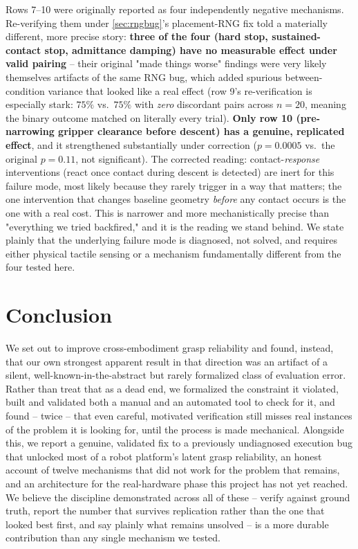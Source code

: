 \documentclass[journal]{IEEEtran}
\begin{document}
Rows 7--10 were originally reported as four independently negative
mechanisms. Re-verifying them under \cref{sec:rngbug}'s placement-RNG fix
told a materially different, more precise story: \textbf{three of the
four (hard stop, sustained-contact stop, admittance damping) have no
measurable effect under valid pairing} -- their original "made things
worse" findings were very likely themselves artifacts of the same RNG bug,
which added spurious between-condition variance that looked like a real
effect (row 9's re-verification is especially stark: $75\%$ vs.\ $75\%$
with \emph{zero} discordant pairs across $n{=}20$, meaning the binary
outcome matched on literally every trial). \textbf{Only row 10
(pre-narrowing gripper clearance before descent) has a genuine, replicated
effect}, and it strengthened substantially under correction ($p{=}0.0005$
vs.\ the original $p{=}0.11$, not significant). The corrected reading:
contact-\emph{response} interventions (react once contact during descent
is detected) are inert for this failure mode, most likely because they
rarely trigger in a way that matters; the one intervention that changes
baseline geometry \emph{before} any contact occurs is the one with a real
cost. This is narrower and more mechanistically precise than "everything
we tried backfired," and it is the reading we stand behind. We state
plainly that the underlying failure mode is diagnosed, not solved, and
requires either physical tactile sensing or a mechanism fundamentally
different from the four tested here.

\section{Conclusion}
\label{sec:conclusion}

We set out to improve cross-embodiment grasp reliability and found,
instead, that our own strongest apparent result in that direction was an
artifact of a silent, well-known-in-the-abstract but rarely formalized
class of evaluation error. Rather than treat that as a dead end, we
formalized the constraint it violated, built and validated both a manual
and an automated tool to check for it, and found -- twice -- that even
careful, motivated verification still misses real instances of the
problem it is looking for, until the process is made mechanical.
Alongside this, we report a genuine, validated fix to a previously
undiagnosed execution bug that unlocked most of a robot platform's latent
grasp reliability, an honest account of twelve mechanisms that did not
work for the problem that remains, and an architecture for the
real-hardware phase this project has not yet reached. We believe the
discipline demonstrated across all of these -- verify against ground
truth, report the number that survives replication rather than the one
that looked best first, and say plainly what remains unsolved -- is a
more durable contribution than any single mechanism we tested.
\end{document}
